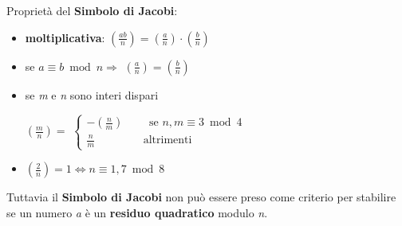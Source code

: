 Proprietà del \textbf{Simbolo di Jacobi}:
\begin{itemize}
    \item \textbf{moltiplicativa}: $(\frac{ab}{n}) = (\frac{a}{n}) \cdot (\frac{b}{n})$
    \item se $a \equiv b \bmod n \Rightarrow$ $(\frac{a}{n}) = (\frac{b}{n})$
    \item se \textit{m} e \textit{n} sono interi dispari
    \begin{center}
        $(\frac{m}{n}) = $
        \begin{math}
            \begin{cases}
                -(\frac{n}{m}) \qquad \text{ se } n,m \equiv 3 \bmod 4 \\
                \frac{n}{m} \qquad \qquad \text{ altrimenti }
            \end{cases}
        \end{math}
    \end{center}
    \item $(\frac{2}{n}) = 1 \iff n \equiv 1, 7 \bmod 8$
\end{itemize}
Tuttavia il \textbf{Simbolo di Jacobi} non può essere preso come criterio per stabilire se un numero \textit{a} è un \textbf{residuo quadratico} modulo \textit{n}.

\newpage
